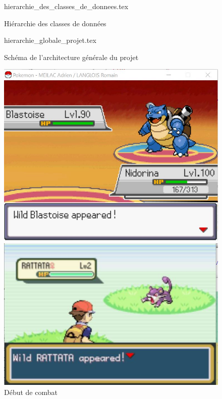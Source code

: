 \documentclass[a4paper,twoside, openany,11pt]{book}
\begin{document}
\newpage

\begin{figure}[!h]\centering
{hierarchie_des_classes_de_donnees.tex}
\caption{Hiérarchie des classes de données}
\end{figure}

\begin{figure}[!h]\centering
{hierarchie_globale_projet.tex}
\caption{Schéma de l'architecture générale du projet}
\end{figure}

\begin{figure}[!h]
\begin{minipage}{0.49\textwidth}
\includegraphics[scale = 0.6]{Images/combat_start.jpg}
\end{minipage}
\begin{minipage}{0.49\textwidth}
\includegraphics[scale = 0.84]{Images/vrai_jeu_combat_start.jpg}
\end{minipage}
\caption{Début de combat}
\end{figure}
\end{document}
